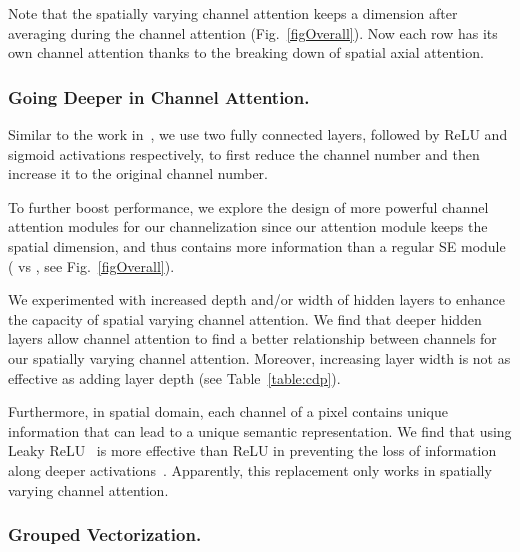 \documentclass[letterpaper]{article} \usepackage{aaai22}  \usepackage{times}  \usepackage{helvet}  \usepackage{courier}  \usepackage[hyphens]{url}  \usepackage{graphicx} \urlstyle{rm} \def\UrlFont{\rm}  \usepackage{natbib}  \usepackage{caption} \DeclareCaptionStyle{ruled}{labelfont=normalfont,labelsep=colon,strut=off} \frenchspacing  \setlength{\pdfpagewidth}{8.5in}  \setlength{\pdfpageheight}{11in}  \usepackage{algorithm}
\begin{document}
Note that the spatially varying channel attention keeps a  dimension after averaging  during the channel attention (Fig.~\ref{figOverall}). 
Now each row has its own channel attention thanks to the breaking down of spatial axial attention.







\subsubsection{Going Deeper in Channel Attention.}
\label{sGoingDeeper}

Similar to the work in~\cite{cSENet}, we use two fully connected layers, followed by ReLU and sigmoid activations respectively, to first reduce the channel number and then increase it to the original channel number.

To further boost performance, we explore the design of more powerful channel attention modules for our channelization since our attention module keeps the spatial dimension, and thus contains more information than a regular SE module ( vs , see Fig.~\ref{figOverall}).

We experimented with increased depth and/or width of hidden layers to enhance the capacity of spatial varying channel attention. 
We find that deeper hidden layers allow channel attention to find a better relationship between channels for our spatially varying channel attention.
Moreover, increasing layer width is not as effective as adding layer depth (see Table~\ref{table:cdp}).

Furthermore, in spatial domain, each channel of a pixel contains unique information that can lead to a unique semantic representation. 
We find that using Leaky ReLU~\cite{cLeakyrelu} is more effective than ReLU in preventing the loss of information along deeper activations~\cite{cMobileNetV2}. 
Apparently, this replacement only works in spatially varying channel attention.

\subsubsection{Grouped Vectorization.} \label {sec:secGroupVect}
\end{document}
